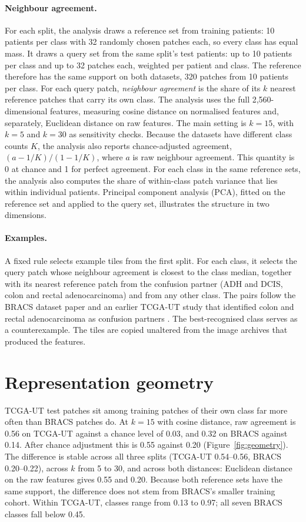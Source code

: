 \documentclass[11pt]{article}
\begin{document}
\paragraph{Neighbour agreement.} For each split, the analysis draws a reference set from training patients: 10 patients per class with 32 randomly chosen patches each, so every class has equal mass. It draws a query set from the same split's test patients: up to 10 patients per class and up to 32 patches each, weighted per patient and class. The reference therefore has the same support on both datasets, 320 patches from 10 patients per class. For each query patch, \emph{neighbour agreement} is the share of its $k$ nearest reference patches that carry its own class. The analysis uses the full 2,560-dimensional features, measuring cosine distance on normalised features and, separately, Euclidean distance on raw features. The main setting is $k=15$, with $k=5$ and $k=30$ as sensitivity checks. Because the datasets have different class counts $K$, the analysis also reports chance-adjusted agreement, $(a-1/K)/(1-1/K)$, where $a$ is raw neighbour agreement. This quantity is 0 at chance and 1 for perfect agreement. For each class in the same reference sets, the analysis also computes the share of within-class patch variance that lies within individual patients. Principal component analysis (PCA), fitted on the reference set and applied to the query set, illustrates the structure in two dimensions.

\paragraph{Examples.} A fixed rule selects example tiles from the first split. For each class, it selects the query patch whose neighbour agreement is closest to the class median, together with its nearest reference patch from the confusion partner (ADH and DCIS, colon and rectal adenocarcinoma) and from any other class. The pairs follow the BRACS dataset paper and an earlier TCGA-UT study that identified colon and rectal adenocarcinoma as confusion partners \citep{brancati2022bracs, queisler2026tailTcga}. The best-recognised class serves as a counterexample. The tiles are copied unaltered from the image archives that produced the features.

\section{Representation geometry}
\label{sec:geometry}
TCGA-UT test patches sit among training patches of their own class far more often than BRACS patches do. At $k=15$ with cosine distance, raw agreement is 0.56 on TCGA-UT against a chance level of 0.03, and 0.32 on BRACS against 0.14. After chance adjustment this is 0.55 against 0.20 (Figure~\ref{fig:geometry}). The difference is stable across all three splits (TCGA-UT 0.54--0.56, BRACS 0.20--0.22), across $k$ from 5 to 30, and across both distances: Euclidean distance on the raw features gives 0.55 and 0.20. Because both reference sets have the same support, the difference does not stem from BRACS's smaller training cohort. Within TCGA-UT, classes range from 0.13 to 0.97; all seven BRACS classes fall below 0.45.
\end{document}
